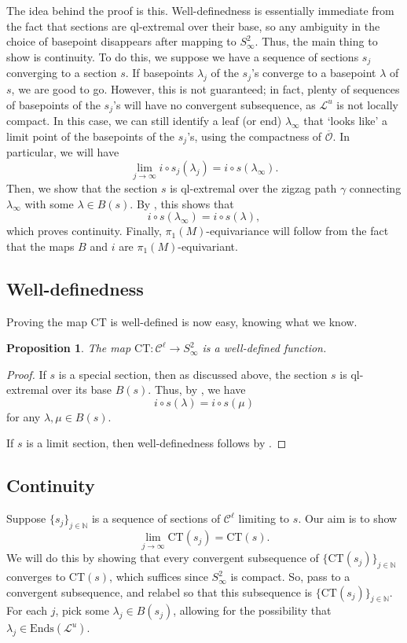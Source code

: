 \documentclass[11pt]{amsart}
\renewcommand{\l}{\lambda}
\newcommand{\mc}{\mathcal}
\newcommand{\N}{\mathbb{N}}
\newcommand{\orb}{\mathcal{O}}
\newcommand{\Ends}{\mathrm{Ends}}
\newcommand{\ct}{\mathrm{CT}}
\numberwithin{equation}{section}
\newtheorem{proposition}[equation]{Proposition}
\theoremstyle{definition}
\begin{document}
The idea behind the proof is this. Well-definedness is essentially immediate from the fact that sections are ql-extremal over their base, so any ambiguity in the choice of basepoint disappears after mapping to $S^2_\infty$. Thus, the main thing to show is continuity. To do this, we suppose we have a sequence of sections $s_j$ converging to a section $s$. If basepoints $\l_j$ of the $s_j$'s converge to a basepoint $\l$ of $s$, we are good to go. However, this is not guaranteed; in fact, plenty of sequences of basepoints of the $s_j$'s will have no convergent subsequence, as $\mc L^u$ is not locally compact. In this case, we can still identify a leaf (or end) $\l_\infty$ that `looks like' a limit point of the basepoints of the $s_j$'s, using the compactness of $\overline{\orb}$. In particular, we will have  
\[
\lim_{j\to\infty}i\circ s_j(\l_j)=i\circ s(\l_\infty).
\]
Then, we show that the section $s$ is ql-extremal over the zigzag path $\gamma$ connecting $\l_\infty$ with some $\l\in B(s)$. By , this shows that 
\[
i\circ s(\l_\infty)=i\circ s(\l),
\]
which proves continuity. Finally, $\pi_1(M)$-equivariance will follow from the fact that the maps $B$ and $i$ are $\pi_1(M)$-equivariant.

\subsection{Well-definedness}

Proving the map $\ct$ is well-defined is now easy, knowing what we know.

\begin{proposition}\label{prop:ct_wd}
	The map $\ct\colon\mc C^\ell\to S^2_\infty$ is a well-defined function.
\end{proposition}



\begin{proof}
	If $s$ is a special section, then as discussed above, the section $s$ is ql-extremal over its base $B(s)$. Thus, by , we have 
	\[
	i\circ s(\l)=i\circ s(\mu)
	\]
	for any $\l,\mu\in B(s)$.

	
	If $s$ is a limit section, then well-definedness follows by . 
\end{proof}


\subsection{Continuity}
 Suppose $\{s_j\}_{j\in\N}$ is a sequence of sections of $\mc C^\ell$ limiting to $s$. Our aim is to show
\[
\lim_{j\to\infty}\ct(s_j)=\ct(s).
\]
We will do this by showing that every convergent subsequence of $\{\ct(s_j)\}_{j\in\N}$ converges to $\ct(s)$, which suffices since $S^2_\infty$ is compact. So, pass to a convergent subsequence, and relabel so that this subsequence is $\{\ct(s_j)\}_{j\in\N}$. For each $j$, pick some $\l_j\in B(s_j)$, allowing for the possibility that $\l_j\in\Ends(\mc L^u)$.
\end{document}
